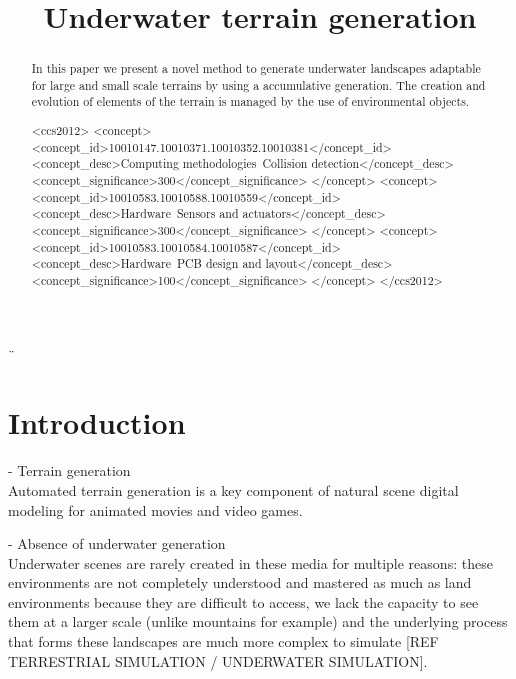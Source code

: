 \documentclass{egpubl}
\title[Underwater terrain generation]%
{Underwater terrain generation}
\author[]{}
\begin{document}

\maketitle
¨\begin{abstract}
	In this paper we present a novel method to generate underwater landscapes adaptable for large and small scale terrains by using a accumulative generation. The creation and evolution of elements of the terrain is managed by the use of environmental objects.
	\begin{CCSXML}
		<ccs2012>
		<concept>
		<concept_id>10010147.10010371.10010352.10010381</concept_id>
		<concept_desc>Computing methodologies~Collision detection</concept_desc>
		<concept_significance>300</concept_significance>
		</concept>
		<concept>
		<concept_id>10010583.10010588.10010559</concept_id>
		<concept_desc>Hardware~Sensors and actuators</concept_desc>
		<concept_significance>300</concept_significance>
		</concept>
		<concept>
		<concept_id>10010583.10010584.10010587</concept_id>
		<concept_desc>Hardware~PCB design and layout</concept_desc>
		<concept_significance>100</concept_significance>
		</concept>
		</ccs2012>
	\end{CCSXML}
	
	
	
	\printccsdesc   
\end{abstract}  


\section{Introduction}
- Terrain generation \\ 
Automated terrain generation is a key component of natural scene digital modeling for animated movies and video games. 

- Absence of underwater generation \\
Underwater scenes are rarely created in these media for multiple reasons: these environments are not completely understood and mastered as much as land environments because they are difficult to access, we lack the capacity to see them at a larger scale (unlike mountains for example) and the underlying process that forms these landscapes are much more complex to simulate [REF TERRESTRIAL SIMULATION / UNDERWATER SIMULATION].
\end{document}
